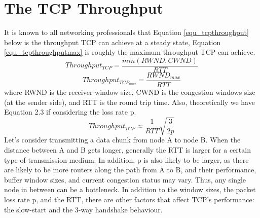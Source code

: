 \chapter{The TCP Throughput}
\label{chap:appA}
It is known to all networking professionals that Equation \ref{equ_tcpthroughput}
below is the throughput TCP can achieve at a steady state,
Equation \ref{equ_tcpthroughputmax} is roughly the maximum throughput TCP
can achieve.
\begin{equation}
 \label{equ_tcpthroughput}
  Throughput_{TCP}=\frac{min(RWND,CWND)}{RTT}
\end{equation}
\begin{equation}
 \label{equ_tcpthroughputmax}
  Throughput_{TCP_{max}}=\frac{RWND_{max}}{RTT}
\end{equation}
where RWND is the receiver window size, CWND is the congestion windows size (at the
sender side), and RTT is the round trip time.
Also, theoretically we have Equation 2.3 if considering the loss rate p.
\begin{equation}
 \label{equ_tcpthroughputmax}
  Throughput_{TCP} \approx \frac{1}{RTT}\sqrt{\frac{3}{2p}}
\end{equation}
Let’s consider transmitting a data chunk from node A to node B. When the distance
between A and B gets longer, generally the RTT is larger for a certain type of transmission
medium. In addition, p is also likely to be larger, as there are likely to be more routers
along the path from A to B, and their performance, buffer window sizes, and current
congestion status may vary. Thus, any single node in between can be a bottleneck.
In addition to the window sizes, the packet loss rate p, and the RTT, there are other
factors that affect TCP’s performance: the slow-start and the 3-way handshake behaviour.
